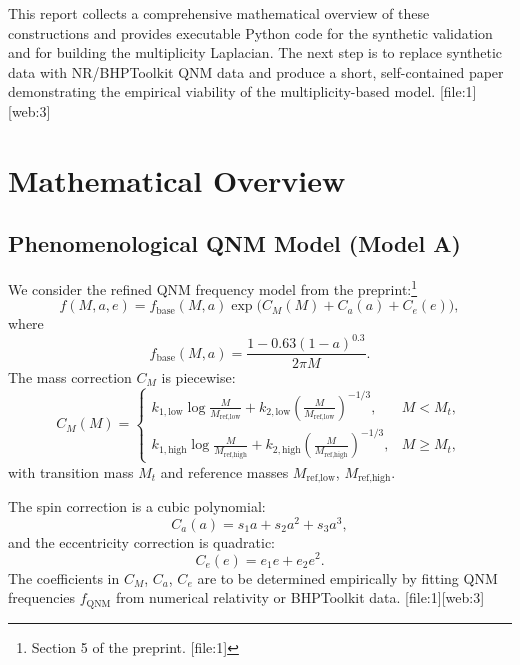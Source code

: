 \documentclass[11pt]{article}
\begin{document}
This report collects a comprehensive mathematical overview of these constructions and provides executable Python code for the synthetic validation and for building the multiplicity Laplacian. The next step is to replace synthetic data with NR/BHPToolkit QNM data and produce a short, self-contained paper demonstrating the empirical viability of the multiplicity-based model. [file:1][web:3]

\section{Mathematical Overview}

\subsection{Phenomenological QNM Model (Model A)}

We consider the refined QNM frequency model from the preprint:\footnote{Section 5 of the preprint. [file:1]}
\begin{equation}
  f(M,a,e) = f_{\text{base}}(M,a) \exp\!\big(C_M(M) + C_a(a) + C_e(e)\big),
  \label{eq:qnm-main}
\end{equation}
where
\begin{equation}
  f_{\text{base}}(M,a) = \frac{1 - 0.63(1-a)^{0.3}}{2\pi M}.
  \label{eq:f-base}
\end{equation}
The mass correction $C_M$ is piecewise:
\begin{equation}
C_M(M)=
\begin{cases}
k_{1,\text{low}}\log\frac{M}{M_{\text{ref,low}}}
+k_{2,\text{low}}\left(\frac{M}{M_{\text{ref,low}}}\right)^{-1/3}, & M<M_t,\\[4pt]
k_{1,\text{high}}\log\frac{M}{M_{\text{ref,high}}}
+k_{2,\text{high}}\left(\frac{M}{M_{\text{ref,high}}}\right)^{-1/3}, & M\ge M_t,
\end{cases}
\label{eq:C-M}
\end{equation}
with transition mass $M_t$ and reference masses $M_{\text{ref,low}}$, $M_{\text{ref,high}}$.

The spin correction is a cubic polynomial:
\begin{equation}
  C_a(a) = s_1 a + s_2 a^2 + s_3 a^3,
  \label{eq:C-a}
\end{equation}
and the eccentricity correction is quadratic:
\begin{equation}
  C_e(e) = e_1 e + e_2 e^2.
  \label{eq:C-e}
\end{equation}
The coefficients in $C_M$, $C_a$, $C_e$ are to be determined empirically by fitting QNM frequencies $f_{\text{QNM}}$ from numerical relativity or BHPToolkit data. [file:1][web:3]
\end{document}
